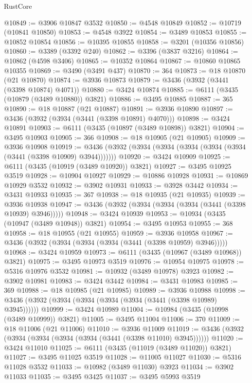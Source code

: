 \begin{lexlean}{RustCore}
\begin{coremodule}
@10849 := @3906 @10847 @3532
@10850 := @4548 @10849
@10852 := @10719 (@10841 @10850)
@10853 := @4548 @3922
@10854 := @3489 @10853
@10855 := @10852 @10854
@10856 := @10395 @10855
@10858 := @3201 (@10356 @10856)
@10860 := @3389 (@3392 @240)
@10862 := @3396 (@3837 @3216)
@10864 := @10862 (@4598 @3406)
@10865 := @10352 @10864
@10867 := @10860 @10865 @10355
@10869 := @3490 (@3491 @437)
@10870 := 364
@10873 := @18 @10870 (@21 @10870)
@10874 := @3936 @10873
@10879 := @3436 (@3932 (@3441 (@3398 @10874) @4071))
@10880 := @3424 @10874
@10885 := @6111 (@3435 (@10879 (@3489 @10880)) @3821)
@10886 := @3495 @10885
@10887 := 365
@10890 := @18 @10887 (@21 @10887)
@10891 := @3936 @10890
@10897 := @3436 (@3932 (@3934 (@3441 (@3398 @10891) @4070)))
@10898 := @3424 @10891
@10903 := @6111 (@3435 (@10897 (@3489 @10898)) @3821)
@10904 := @3495 @10903
@10905 := 366
@10908 := @18 @10905 (@21 @10905)
@10909 := @3936 @10908
@10919 := @3436 (@3932 (@3934 (@3934 (@3934 (@3934 (@3934 (@3441 (@3398 @10909) @3944)))))))
@10920 := @3424 @10909
@10925 := @6111 (@3435 (@10919 (@3489 @10920)) @3821)
@10927 := @3495 @10925 @3519
@10928 := @10904 @10927
@10929 := @10886 @10928
@10931 := @10869 @10929 @3532
@10932 := @3902 @10931
@10933 := @3928 @3442
@10934 := @3431 @10933
@10935 := 367
@10938 := @18 @10935 (@21 @10935)
@10939 := @3936 @10938
@10947 := @3436 (@3932 (@3934 (@3934 (@3934 (@3441 (@3398 @10939) @3946)))))
@10948 := @3424 @10939
@10953 := @10934 (@3435 (@10947 (@3489 @10948)) @3821)
@10954 := @3495 @10953
@10955 := 368
@10958 := @18 @10955 (@21 @10955)
@10959 := @3936 @10958
@10967 := @3436 (@3932 (@3934 (@3934 (@3934 (@3441 (@3398 @10959) @3946)))))
@10968 := @3424 @10959
@10973 := @6111 (@3435 (@10967 (@3489 @10968)) @3821)
@10975 := @3495 @10973 @3519
@10976 := @10954 @10975
@10978 := @5316 @10976 @3532
@10981 := @10932 (@3489 @10978) @3923
@10982 := @3902 @10981
@10983 := @3424 @3442
@10984 := @3431 @10983
@10985 := 369
@10988 := @18 @10985 (@21 @10985)
@10989 := @3936 @10988
@10998 := @3436 (@3932 (@3934 (@3934 (@3934 (@3934 (@3441 (@3398 @10989) @3945))))))
@10999 := @3424 @10989
@11004 := @10984 (@3435 (@10998 (@3489 @10999)) @3821)
@11005 := @3495 @11004
@11006 := 370
@11009 := @18 @11006 (@21 @11006)
@11010 := @3936 @11009
@11019 := @3436 (@3932 (@3934 (@3934 (@3934 (@3934 (@3441 (@3398 @11010) @3945))))))
@11020 := @3424 @11010
@11025 := @6111 (@3435 (@11019 (@3489 @11020)) @3821)
@11027 := @3495 @11025 @3519
@11028 := @11005 @11027
@11030 := @5316 @11028 @3532
@11033 := @10982 (@3489 @11030) @3923
@11034 := @3902 @11033
@11035 := @3495 @3425
@11037 := @3495 @5993 @3519

\end{coremodule}
\end{lexlean}
